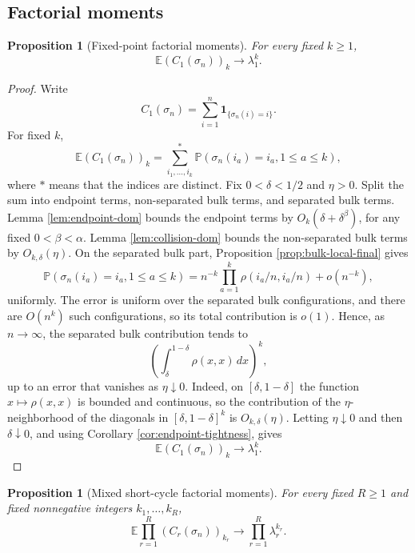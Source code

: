 \documentclass[11pt]{article}
\newtheorem{proposition}[theorem]{Proposition}
\theoremstyle{remark}
\newcommand{\Pp}{\mathbb P}
\newcommand{\Ee}{\mathbb E}
\newcommand{\one}{\mathbf 1}
\newcommand{\dd}{\,d}
\begin{document}
\subsection{Factorial moments}

\begin{proposition}[Fixed-point factorial moments]\label{prop:regular-fixed-factorial}
For every fixed \(k\ge1\),
\[
        \Ee(C_1(\sigma_n))_k\to \lambda_1^k.
\]
\end{proposition}

\begin{proof}
Write
\[
        C_1(\sigma_n)=\sum_{i=1}^n\one_{\{\sigma_n(i)=i\}}.
\]
For fixed \(k\),
\[
        \Ee(C_1(\sigma_n))_k
        =\sum_{i_1,\ldots,i_k}^{*}
        \Pp(\sigma_n(i_a)=i_a,1\le a\le k),
\]
where \(*\) means that the indices are distinct.  Fix \(0<\delta<1/2\) and \(\eta>0\).  Split the sum into endpoint terms, non-separated bulk terms, and separated bulk terms.  Lemma \ref{lem:endpoint-dom} bounds the endpoint terms by \(O_k(\delta+\delta^\beta)\), for any fixed \(0<\beta<\alpha\).  Lemma \ref{lem:collision-dom} bounds the non-separated bulk terms by \(O_{k,\delta}(\eta)\).  On the separated bulk part, Proposition \ref{prop:bulk-local-final} gives
\[
        \Pp(\sigma_n(i_a)=i_a,1\le a\le k)
        =n^{-k}\prod_{a=1}^k\rho(i_a/n,i_a/n)+o(n^{-k}),
\]
uniformly.  The error is uniform over the separated bulk configurations, and there are \(O(n^k)\) such configurations, so its total contribution is \(o(1)\).  Hence, as \(n\to\infty\), the separated bulk contribution tends to
\[
        \left(\int_\delta^{1-\delta}\rho(x,x)\dd x\right)^k,
\]
up to an error that vanishes as \(\eta\downarrow0\).  Indeed, on \([\delta,1-\delta]\) the function \(x\mapsto\rho(x,x)\) is bounded and continuous, so the contribution of the \(\eta\)-neighborhood of the diagonals in \([\delta,1-\delta]^k\) is \(O_{k,\delta}(\eta)\).  Letting \(\eta\downarrow0\) and then \(\delta\downarrow0\), and using Corollary \ref{cor:endpoint-tightness}, gives
\[
        \Ee(C_1(\sigma_n))_k\to \lambda_1^k.
\]
\end{proof}

\begin{proposition}[Mixed short-cycle factorial moments]\label{prop:regular-cycle-factorial}
For every fixed \(R\ge1\) and fixed nonnegative integers \(k_1,\ldots,k_R\),
\[
        \Ee\prod_{r=1}^R(C_r(\sigma_n))_{k_r}
        \to \prod_{r=1}^R\lambda_r^{k_r}.
\]
\end{proposition}
\end{document}
